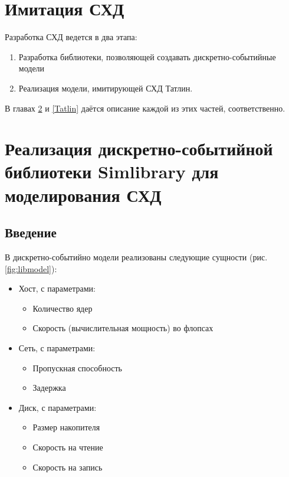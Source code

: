 \section{Имитация СХД}

Разработка СХД ведется в два этапа:
\begin{enumerate}
\item Разработка библиотеки, позволяющей создавать дискретно-событийные модели  
\item Реализация модели, имитирующей СХД Татлин.
\end{enumerate}

В главах \ref{LIB} и \ref{Tatlin} даётся описание каждой из этих частей, соответственно.

\section{Реализация дискретно-событийной библиотеки Simlibrary для моделирования СХД}\label{LIB}

\subsection{Введение}
В дискретно-событийно модели реализованы следующие сущности (рис. \ref{fig:libmodel}):
\begin{itemize}
\item Хост, с параметрами:
	\begin{itemize}
	\item Количество ядер
	\item Скорость (вычислительная мощность) во флопсах 	
	\end{itemize}
\item Сеть, с параметрами:
	\begin{itemize}
	\item 	Пропускная способность
	\item 	Задержка
	\end{itemize}
\item Диск, с параметрами:
	\begin{itemize}
	\item 	Размер накопителя
	\item 	Скорость на чтение 
	\item 	Скорость на запись
	\end{itemize}
\end{itemize}

